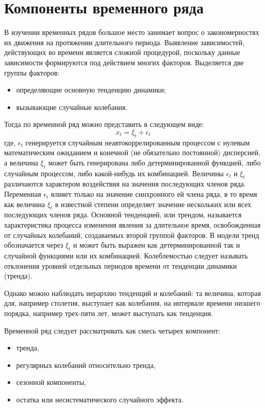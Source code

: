 \section{Компоненты временного ряда}
В изучении временных рядов большое место занимает вопрос о закономерностях их движения на протяжении длительного периода. Выявление зависимостей, действующих во времени является сложной процедурой, поскольку данные зависимости формируются под действием многих факторов. Выделяется две группы факторов:
\begin{itemize}
	\item определяющие основную тенденцию динамики;
	\item вызывающие случайные колебания.
\end{itemize}

Тогда по временной ряд можно представить в следующем виде:
$$
x_t = \xi_t + \epsilon_t
$$
где, $\epsilon_t$ генерируется случайным неавтокоррелированным процессом с нулевым математическим ожиданием
и конечной (не обязательно постоянной) дисперсией, а величина $\xi_t$ может быть генерирована либо детерминированной функцией, либо случайным процессом, либо какой-нибудь их комбинацией. Величины $\epsilon_t$ и $\xi_t$ различаются характером воздействия на значения последующих членов ряда. Переменная $\epsilon_t$ влияет только на значение синхронного ей члена ряда, в то время как величина $\xi_t$ в известной степени определяет значение нескольких или всех последующих членов ряда. 
Основной тенденцией, или трендом, называется характеристика процесса изменения явления за длительное время, освобожденная от случайных колебаний, создаваемых второй группой факторов.  В модели тренд обозначается через $\xi_t$ и может быть выражен как детерминированной так и случайной функциями или их комбинацией. 
Колеблемостью следует называть отклонения уровней отдельных периодов времени от тенденции динамики (тренда).

Однако можно наблюдать иерархию тенденций и колебаний: та величина, которая для, например столетия, выступает как колебания, на интервале времени низшего порядка, например трех-пяти лет, может выступать как тенденция.

Временной ряд следует рассматривать как смесь четырех компонент:
\begin{itemize}
	\item тренда,
	\item регулярных колебаний относительно тренда,
	\item сезонной компоненты,
	\item остатка или несистематического случайного эффекта.
\end{itemize}


